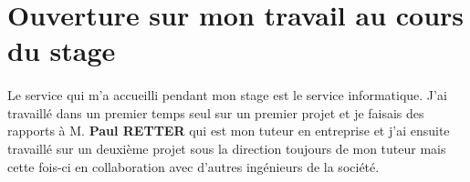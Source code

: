 \section{Ouverture sur mon travail au cours du stage}
\paragraph*{}
Le service qui m'a accueilli pendant mon stage est le service informatique. J'ai travaillé dans un premier temps seul sur un premier projet et je faisais des rapports à M. \textbf{Paul RETTER} qui est mon tuteur en entreprise et j'ai ensuite travaillé sur un deuxième projet sous la direction toujours de mon tuteur  mais cette fois-ci en collaboration avec d'autres ingénieurs de la société.